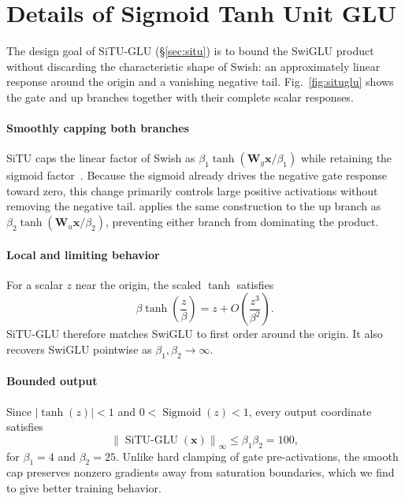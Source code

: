 


\section{Details of Sigmoid Tanh Unit GLU}
\label{app:situglu}

The design goal of SiTU-GLU (\S\ref{sec:situ}) is to bound the SwiGLU product without discarding the characteristic shape of Swish: an approximately linear response around the origin and a vanishing negative tail.
Fig.~\ref{fig:situglu} shows the gate and up branches together with their complete scalar responses.

\paragraph{Smoothly capping both branches}
SiTU caps the linear factor of Swish as $\beta_1\tanh(\mathbf{W}_g\bm{x}/\beta_1)$ while retaining the sigmoid factor~\citep{kimik3blog}.
Because the sigmoid already drives the negative gate response toward zero, this change primarily controls large positive activations without removing the negative tail.
 applies the same construction to the up branch as $\beta_2\tanh(\mathbf{W}_u\bm{x}/\beta_2)$, preventing either branch from dominating the product.

\paragraph{Local and limiting behavior}
For a scalar $z$ near the origin, the scaled $\tanh$ satisfies
\begin{equation}
    \beta\tanh\!\left(\frac{z}{\beta}\right)
    = z + O\!\left(\frac{z^3}{\beta^2}\right).
\end{equation}
SiTU-GLU therefore matches SwiGLU to first order around the origin.
It also recovers SwiGLU pointwise as $\beta_1,\beta_2\rightarrow\infty$.

\paragraph{Bounded output}
Since $|\tanh(z)|<1$ and $0<\operatorname{Sigmoid}(z)<1$, every output coordinate satisfies
\begin{equation}
    \left\|\operatorname{SiTU\text{-}GLU}(\bm{x})\right\|_{\infty}
    \leq \beta_1\beta_2
    = 100,
    \label{eq:situglu-bound}
\end{equation}
for $\beta_1=4$ and $\beta_2=25$.
Unlike hard clamping of gate pre-activations, the smooth cap preserves nonzero gradients away from saturation boundaries, which we find to give better training behavior.

